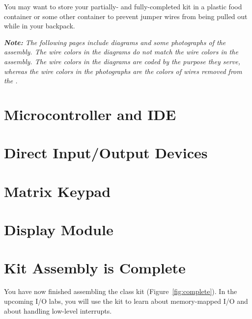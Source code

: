     You may want to store your partially- and fully-completed kit in a plastic food container or some other container to prevent jumper wires from being pulled out while in your backpack.

    \textit{
        \textbf{Note:} The following pages include diagrams and some photographs of the assembly.
        The wire colors in the diagrams do not match the wire colors in the assembly.
        The wire colors in the diagrams are coded by the purpose they serve, whereas the wire colors in the photographs are the colors of wires removed from the \rainbow.
    }

\section{Microcontroller and IDE}                           

\section{Direct Input/Output Devices}                       

\section{Matrix Keypad} \label{sec:keypad}                  

\section{Display Module}                                    

\section*{Kit Assembly is Complete}

    You have now finished assembling the class kit (Figure~\ref{fig:complete}).
    In the upcoming I/O labs, you will use the kit to learn about memory-mapped I/O and about handling low-level interrupts.

